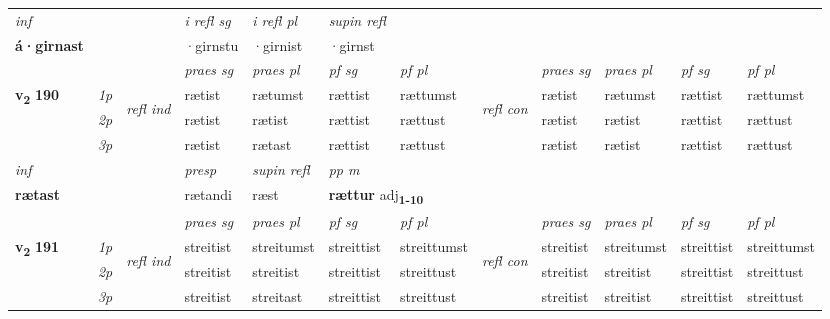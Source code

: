 \begin{longtable}[l]{X>{\footnotesize\itshape}llXXXXlXXXX}
   {\textit{inf}} & &   & \textit{i refl sg} & \textit{i refl pl}   & \textit{supin refl}  \\*
  {\textbf{á\allowbreak ·girnast}} & &   & ·girnstu & ·girnist   & ·girnst  \\*

\midrule

 & &   & \textit{praes sg}  & \textit{praes pl}    & \textit{ pf sg} & \textit{pf pl} & & \textit{praes sg}  & \textit{praes pl}    & \textit{pf sg} & \textit{pf pl }  \\ \cmidrule{4-7} \cmidrule{9-12}
 \multirow{2}{*}{{{\textbf{v{\textsubscript{2}}} \Large{\textbf{190}}}}}  & 1p & \multirow{3}{*}{\begin{turn}{90}\textit{refl ind}\end{turn}}  & rætist & rætumst & rættist & rættumst & \multirow{3}{*}{\begin{turn}{90}\textit{refl con}\end{turn}}  &rætist & rætumst & rættist & rættumst \\*
 & 2p &  & rætist & rætist & rættist & rættust & &rætist & rætist & rættist & rættust \\*
 & 3p  & & rætist & rætast & rættist & rættust & & rætist & rætist& rættist & rættust \\*
\cmidrule{4-7} \cmidrule{9-12}

   {\textit{inf}} & &     & \textit{presp}  & \textit{supin refl} & \textit{pp m} \\*
  {\textbf{rætast}} & &     & rætandi  & ræst & \multicolumn{2}{l}{\textbf{rættur} adj\textbf{\textsubscript{1-10}}} \\*

\midrule

 & &   & \textit{praes sg}  & \textit{praes pl}    & \textit{ pf sg} & \textit{pf pl} & & \textit{praes sg}  & \textit{praes pl}    & \textit{pf sg} & \textit{pf pl }  \\ \cmidrule{4-7} \cmidrule{9-12}
 \multirow{2}{*}{{{\textbf{v{\textsubscript{2}}} \Large{\textbf{191}}}}}  & 1p & \multirow{3}{*}{\begin{turn}{90}\textit{refl ind}\end{turn}}  & streitist & streitumst & streittist & streittumst & \multirow{3}{*}{\begin{turn}{90}\textit{refl con}\end{turn}}  &streitist & streitumst & streittist & streittumst \\*
 & 2p &  & streitist & streitist & streittist & streittust & &streitist & streitist & streittist & streittust \\*
 & 3p  & & streitist & streitast & streittist & streittust & & streitist & streitist& streittist & streittust \\*
\cmidrule{4-7} \cmidrule{9-12}


\end{longtable}
